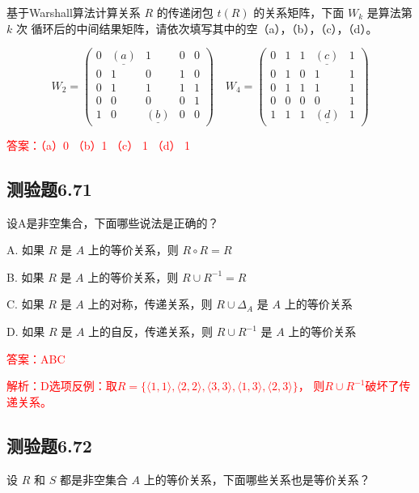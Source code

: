\documentclass[UTF8, heading=true]{ctexart}
\begin{document}
基于Warshall算法计算关系 $R$ 的传递闭包 $t(R)$ 的关系矩阵，下面 $W_k$ 是算法第 $k$ 次
循环后的中间结果矩阵，请依次填写其中的空（a），（b），（c），（d）。

$$
W_2=\left(\begin{array}{ccccc}
0 & \underline{(a)} & 1 & 0 & 0 \\
0 & 1 & 0 & 1 & 0 \\
0 & 1 & 1 & 1 & 1 \\
0 & 0 & 0 & 0 & 1 \\
1 & 0 & \underline{(b)} & 0 & 0
\end{array}\right) \quad W_4=\left(\begin{array}{ccccc}
0 & 1 & 1 & \underline{(c)} & 1 \\
0 & 1 & 0 & 1 & 1 \\
0 & 1 & 1 & 1 & 1 \\
0 & 0 & 0 & 0 & 1 \\
1 & 1 & 1 & \underline{(d)} & 1
\end{array}\right)
$$



\textcolor{red}{答案：（a）0 （b）1 （c） 1 （d） 1}

\subsection{测验题6.71}

设A是非空集合，下面哪些说法是正确的？

A. 如果 $R$ 是 $A$ 上的等价关系，则 $R \circ R=R$

B. 如果 $R$ 是 $A$ 上的等价关系，则 $R \cup R^{-1}=R$

C. 如果 $R$ 是 $A$ 上的对称，传递关系，则 $R \cup \Delta_A$ 是 $A$ 上的等价关系

D. 如果 $R$ 是 $A$ 上的自反，传递关系，则 $R \cup R^{-1}$ 是 $A$ 上的等价关系

\textcolor{red}{答案：ABC}

\textcolor{red}{解析：D选项反例：取$R=\{\langle 1,1\rangle, \langle 2,2\rangle, \langle 3,3\rangle , \langle 1 , 3 \rangle , \langle 2 , 3 \rangle \}$，
则$R \cup R^{-1}$破坏了传递关系。}



\subsection{测验题6.72}

设 $R$ 和 $S$ 都是非空集合 $A$ 上的等价关系，下面哪些关系也是等价关系？
\end{document}
